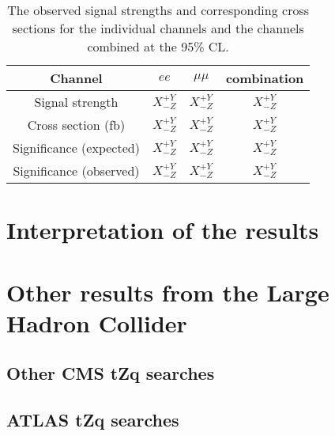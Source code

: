 \begin{table}[!h]
   \centering
   \caption{The observed signal strengths and corresponding cross sections for
   the individual channels and the channels combined at the 95\% CL.}
   \begin{tabular}{cccc}
       \hline
       Channel & $ee$ & $\mu\mu$ & \textbf{combination} \\
        \hline
        Signal strength & $X_{-Z}^{+Y}$ & $X_{-Z}^{+Y}$ & $X_{-Z}^{+Y}$ \\
       Cross section (fb) & $X_{-Z}^{+Y}$ & $X_{-Z}^{+Y}$ & $X_{-Z}^{+Y}$ \\
       Significance (expected) & $X_{-Z}^{+Y}$ & $X_{-Z}^{+Y}$ & $X_{-Z}^{+Y}$ \\
       Significance (observed) & $X_{-Z}^{+Y}$ & $X_{-Z}^{+Y}$ & $X_{-Z}^{+Y}$ \\
        \hline
    \end{tabular}
   \label{tab:shapetxs}
\end{table}

\section{Interpretation of the results}
\section{Other results from the Large Hadron Collider}
\subsection{Other CMS tZq searches}
\subsection{ATLAS tZq searches}

